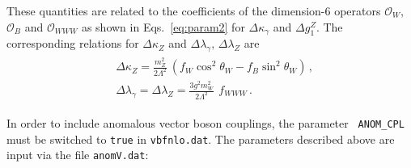 \documentclass[english,12pt]{article}
\begin{document}
These quantities are related to the coefficients of the dimension-6 operators
$\mathcal{O}_{W}$, $\mathcal{O}_{B}$ and $\mathcal{O}_{WWW}$ as shown in 
Eqs.~\eqref{eq:param2} for $\Delta\kappa_\gamma$ and $\Delta g_1^Z$.
The corresponding relations for $\Delta\kappa_Z$ and $\Delta \lambda_\gamma, \, \Delta\lambda_Z$ are
\begin{align} \label{eq:param2part2}
\begin{split}
&\Delta \kappa_Z = \frac{m_Z^2}{2 \Lambda^2} \
(f_W \cos^2 \theta_W - f_B \sin^2 \theta_W)\,,\\
&\Delta \lambda_\gamma = \Delta\lambda_Z = \frac{3 g^2 m_W^2}{2 \Lambda^2}\, \ f_{WWW} \,.
\end{split}
\end{align}

In order to include anomalous vector boson couplings, the parameter {\tt
ANOM\_CPL} must be switched to {\tt true} in {\tt vbfnlo.dat}.  The parameters
described above are input via the file {\tt anomV.dat}:
\end{document}
